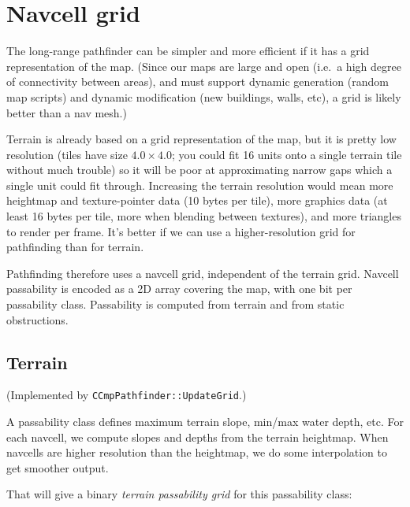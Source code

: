 \documentclass[a4paper,10pt]{article}
\begin{document}
\section{Navcell grid}

The long-range pathfinder can be simpler and more efficient if it has a
grid representation of the map.
(Since our maps are large and open (i.e.\ a high degree of connectivity
between areas), and must support dynamic generation (random map scripts)
and dynamic modification (new buildings, walls, etc),
a grid is likely better than a nav mesh.)

Terrain is already based on a grid representation of the map,
but it is pretty low resolution (tiles have size $4.0 \times 4.0$;
you could fit 16 units onto a single terrain tile without much trouble)
so it will be poor at approximating narrow gaps which a single unit could fit through.
Increasing the terrain resolution would mean more heightmap and texture-pointer data
(10 bytes per tile),
more graphics data
(at least 16 bytes per tile, more when blending between textures),
and more triangles to render per frame.
It's better if we can use a higher-resolution grid for pathfinding than for terrain.

Pathfinding therefore uses a navcell grid, independent of the terrain grid.
Navcell passability is encoded as a 2D array covering the map,
with one bit per passability class.
Passability is computed from terrain and from static obstructions.

\subsection{Terrain}

(Implemented by \texttt{CCmpPathfinder::UpdateGrid}.)

A passability class defines maximum terrain slope, min/max water depth, etc.
For each navcell, we compute slopes and depths from the terrain heightmap.
When navcells are higher resolution than the heightmap, we do some interpolation
to get smoother output.

That will give a binary \emph{terrain passability grid} for this passability class:

\end{document}
